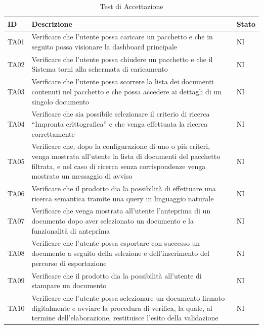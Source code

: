 \documentclass[a4paper,12pt]{article}
\begin{document}
            \begin{longtable}{|M{1.5cm}|M{8.5cm}|M{2cm}|}

                \caption{Test di Accettazione} \\
                \hline
                \textbf{ID} & \textbf{Descrizione} & \textbf{Stato} \\
                \hline
                \endhead

                TA01 & Verificare che l'utente possa caricare un pacchetto e che in seguito possa visionare la dashboard principale & NI \\
                \hline
                
                TA02 & Verificare che l'utente possa chiudere un pacchetto e che il Sistema torni alla schermata di caricamento & NI \\
                \hline

                TA03 & Verificare che l’utente possa scorrere la lista dei documenti contenuti nel pacchetto e che possa accedere ai dettagli di un singolo documento & NI \\
                \hline
                
                TA04 & Verificare che sia possibile selezionare il criterio di ricerca “Impronta crittografica” e che venga effettuata la ricerca correttamente & NI \\
                \hline

                TA05 & Verificare che, dopo la configurazione di uno o più criteri, venga mostrata all'utente la lista di documenti del pacchetto filtrata, e nel caso di ricerca senza corrispondenze venga mostrato un messaggio di avviso & NI \\
                \hline
                
                TA06 & Verificare che il prodotto dia la possibilità di effettuare una ricerca semantica tramite una query in linguaggio naturale & NI \\
                \hline

                TA07 & Verificare che venga mostrata all’utente l’anteprima di un documento dopo aver selezionato un documento e la funzionalità di anteprima & NI \\
                \hline
                
                TA08 & Verificare che l’utente possa esportare con successo un documento a seguito della selezione e dell’inserimento del percorso di esportazione & NI \\
                \hline

                TA09 & Verificare che il prodotto dia la possibilità all’utente di stampare un documento & NI \\
                \hline

                TA10 & Verificare che l’utente possa selezionare un documento firmato digitalmente e avviare la procedura di verifica, la quale, al termine dell’elaborazione, restituisce l’esito della validazione & NI \\
                \hline

            \end{longtable}
\end{document}
